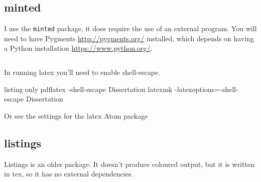 \subsection{minted}
I use the \texttt{minted} package,  it does require the use of an external program.  You will need to have Pygments \url{http://pygments.org/} installed, which depends on having a Python installation \url{https://www.python.org/}.

\begin{tcblisting}{}
\inputminted{c}{hello.c}
\end{tcblisting}

In running latex you'll need to enable shell-escape.
\begin{tcblisting}{listing only}
pdflatex -shell-escape Dissertation
latexmk -latexoptions=-shell-escape Dissertation
\end{tcblisting}
Or see the settings for the latex Atom package

\subsection{listings}
Listings is an older package.  It doesn't produce coloured output, but it is written in tex, so it has no external dependencies.
\begin{tcblisting}{}
\lstset{language=c}

\end{tcblisting}
